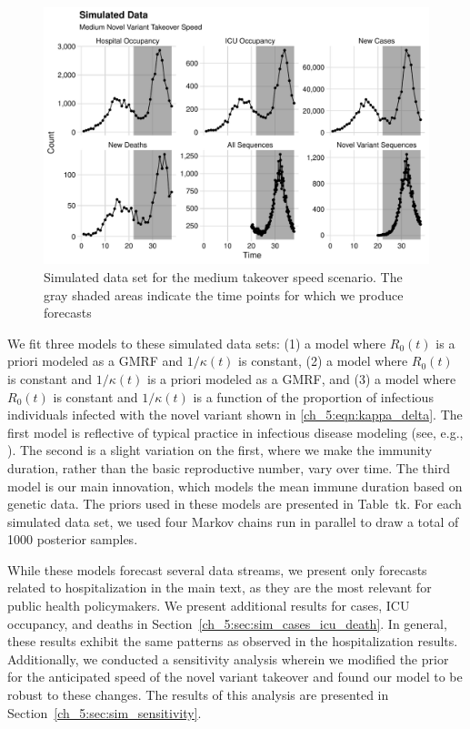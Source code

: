 \begin{figure}
    \centering
    \includegraphics[width=1.0\columnwidth]{simulated_binned_data_medium_plot}
    \caption[Simulated data set for the medium takeover speed scenario.]{Simulated data set for the medium takeover speed scenario.
    The gray shaded areas indicate the time points for which we produce forecasts}
    \label{ch_5:fig:simulated_binned_data_medium_plot}
\end{figure}

We fit three models to these simulated data sets: (1) a model where \( R_0(t) \) is a priori modeled as a GMRF and \( 1 / \kappa(t) \) is constant, (2) a model where \( R_0(t) \) is constant and \( 1 / \kappa(t) \) is a priori modeled as a GMRF, and (3) a model where \( R_0(t) \) is constant and \( 1 / \kappa(t) \) is a function of the proportion of infectious individuals infected with the novel variant shown in \eqref{ch_5:eqn:kappa_delta}.
The first model is reflective of typical practice in infectious disease modeling (see, e.g., \citep{Gibson2020real, ODea2021semi}).
The second is a slight variation on the first, where we make the immunity duration, rather than the basic reproductive number, vary over time.
The third model is our main innovation, which models the mean immune duration based on genetic data.
The priors used in these models are presented in Table~tk.
For each simulated data set, we used four Markov chains run in parallel to draw a total of 1000 posterior samples.

While these models forecast several data streams, we present only forecasts related to hospitalization in the main text, as they are the most relevant for public health policymakers.
We present additional results for cases, ICU occupancy, and deaths in Section~\ref{ch_5:sec:sim_cases_icu_death}.
In general, these results exhibit the same patterns as observed in the hospitalization results.
Additionally, we conducted a sensitivity analysis wherein we modified the prior for the anticipated speed of the novel variant takeover and found our model to be robust to these changes.
The results of this analysis are presented in Section~\ref{ch_5:sec:sim_sensitivity}.

